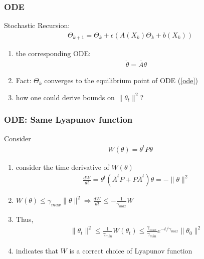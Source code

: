 \documentclass[t,10pt]{beamer}
\theoremstyle{remark}
\begin{document}



\begin{frame}
\frametitle{ODE}
Stochastic Recursion:
\begin{align} 
\Theta_{k+1} = \Theta_k + \epsilon(A(X_k) \Theta_k + b(X_k))
\end{align} 
\begin{enumerate}
\item the corresponding ODE:
\begin{align} \label{ode}
\dot {\theta} = \overline{A}\theta
\end{align}
\item Fact: $\Theta_k$ converges to the equilibrium point of ODE (\ref{ode})
\item how one could derive bounds on $\|\theta_t\|^2$?
\end{enumerate}

\end{frame}











\begin{frame}
\frametitle{ODE: Same Lyapunov function}
Consider 
\begin{align} 
W(\theta) = \theta^t P \theta
\end{align} 
\begin{enumerate}
\item consider the time derivative of $W(\theta)$
\begin{align} 
\frac{dW}{dt} = \theta^t\left(\overline{A}^tP + P\overline{A}^t\right) \theta = -\|\theta\|^2
\end{align}
\item $W(\theta) \leq \gamma_{max} \|\theta\|^2 \Rightarrow \frac{dW}{dt} \leq -\frac{1}{\gamma_{max}} W$
\item Thus,
\begin{align}
\|\theta_t\|^2 \leq \frac{1}{\gamma_{min}}W(\theta_t) \leq \frac{\gamma_{max}}{\gamma_{min}}e^{-t/\gamma_{max}}\|\theta_0\|^2
\end{align}
\item indicates that $W$ is a correct choice of Lyapunov function
\end{enumerate}

\end{frame}
\end{document}
